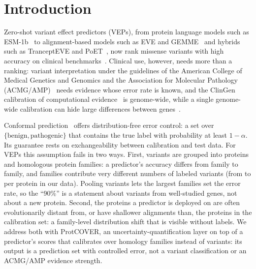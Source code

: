 \section{Introduction}\label{sec:intro}

Zero-shot variant effect predictors (VEPs), from protein language models such as ESM-1b~\cite{rives2021biological,brandes2023genome} to alignment-based models such as EVE and GEMME~\cite{frazer2021disease,laine2019gemme} and hybrids such as TranceptEVE and PoET~\cite{notin2022trancepteve,truong2023poet}, now rank missense variants with high accuracy on clinical benchmarks~\cite{notin2023proteingym}. Clinical use, however, needs more than a ranking: variant interpretation under the guidelines of the American College of Medical Genetics and Genomics and the Association for Molecular Pathology (ACMG/AMP)~\cite{richards2015standards} needs evidence whose error rate is known, and the ClinGen calibration of computational evidence~\cite{pejaver2022calibration} is genome-wide, while a single genome-wide calibration can hide large differences between genes~\cite{tejura2024calibration}.

Conformal prediction~\cite{vovk2005algorithmic,angelopoulos2023gentle} offers distribution-free error control: a set over $\{\text{benign},\text{pathogenic}\}$ that contains the true label with probability at least $1-\alpha$. Its guarantee rests on exchangeability between calibration and test data. For VEPs this assumption fails in two ways. First, variants are grouped into proteins and homologous protein families: a predictor's accuracy differs from family to family, and families contribute very different numbers of labeled variants (from \minVar{} to \maxVar{} per protein in our data). Pooling variants lets the largest families set the error rate, so the ``90\%'' is a statement about variants from well-studied genes, not about a new protein. Second, the proteins a predictor is deployed on are often evolutionarily distant from, or have shallower alignments than, the proteins in the calibration set: a family-level distribution shift that is visible without labels. We address both with ProtCOVER, an uncertainty-quantification layer on top of a predictor's scores that calibrates over homology families instead of variants: its output is a prediction set with controlled error, not a variant classification or an ACMG/AMP evidence strength.

